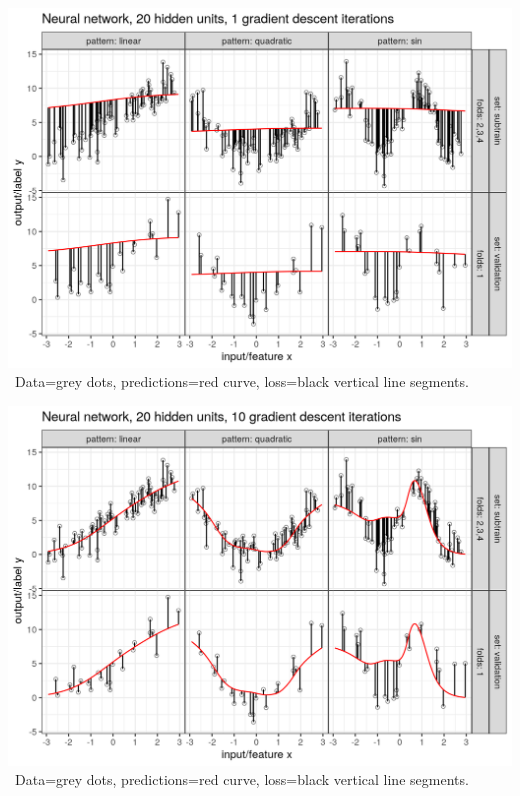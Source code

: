 
\begin{frame}
  \includegraphics[width=\textwidth]{figure-overfitting-pred-units=20-maxit=1.png}
\
Data=grey dots, predictions=red curve, loss=black vertical line segments.
\end{frame}


\begin{frame}
  \includegraphics[width=\textwidth]{figure-overfitting-pred-units=20-maxit=10.png}
\
Data=grey dots, predictions=red curve, loss=black vertical line segments.
\end{frame}


